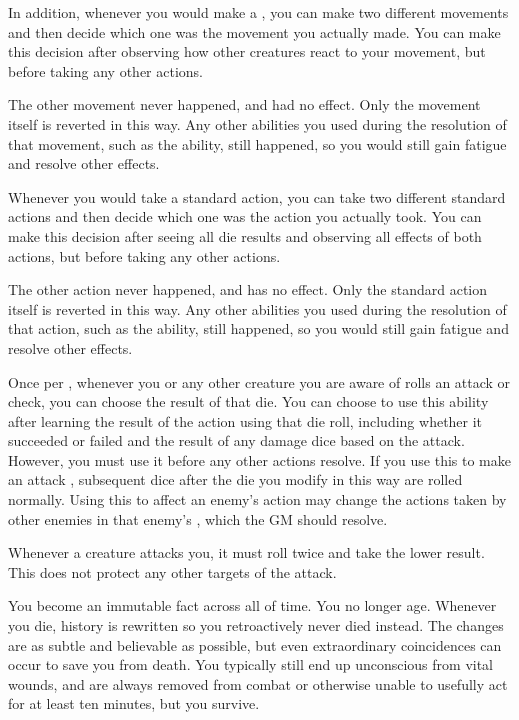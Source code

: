             In addition, whenever you would make a , you can make two different movements and then decide which one was the movement you actually made.
            You can make this decision after observing how other creatures react to your movement, but before taking any other actions.

            The other movement never happened, and had no effect.
            Only the movement itself is reverted in this way.
            Any other abilities you used during the resolution of that movement, such as the  ability, still happened, so you would still gain fatigue and resolve other effects.

             Whenever you would take a standard action, you can take two different standard actions and then decide which one was the action you actually took.
            You can make this decision after seeing all die results and observing all effects of both actions, but before taking any other actions.

            The other action never happened, and has no effect.
            Only the standard action itself is reverted in this way.
            Any other abilities you used during the resolution of that action, such as the  ability, still happened, so you would still gain fatigue and resolve other effects.

             Once per , whenever you or any other creature you are aware of rolls an attack or check, you can choose the result of that die.
            You can choose to use this ability after learning the result of the action using that die roll, including whether it succeeded or failed and the result of any damage dice based on the attack.
            However, you must use it before any other actions resolve.
            If you use this to make an attack , subsequent dice after the die you modify in this way are rolled normally.
            Using this to affect an enemy's action may change the actions taken by other enemies in that enemy's , which the GM should resolve.

             Whenever a creature attacks you, it must roll twice and take the lower result.
            This does not protect any other targets of the attack.

             You become an immutable fact across all of time.
            You no longer age.
            Whenever you die, history is rewritten so you retroactively never died instead.
            The changes are as subtle and believable as possible, but even extraordinary coincidences can occur to save you from death.
            You typically still end up unconscious from vital wounds, and are always removed from combat or otherwise unable to usefully act for at least ten minutes, but you survive.

